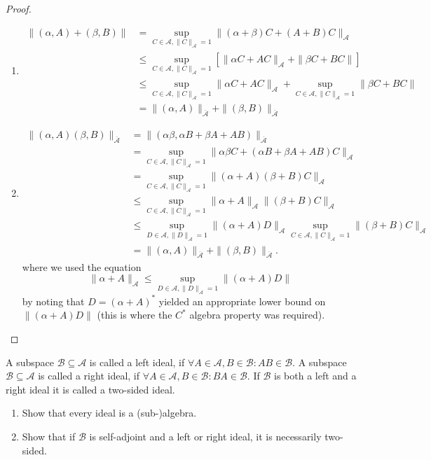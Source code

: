 \begin{proof}
	\begin{enumerate}
		\item 
			\begin{align*}
				\|(\alpha, A) + (\beta, B)\| &= \sup_{C\in \mathcal{A}, \|C\|_\mathcal{A}=1} \|(\alpha+\beta)C + (A+B)C\|_\mathcal{A} \\
							     &\le \sup_{C\in \mathcal{A}, \|C\|_\mathcal{A}=1}\left[ \|\alpha C + A C\|_\mathcal{A} + \|\beta C + BC\| \right]\\ 
							     &\le \sup_{C\in \mathcal{A}, \|C\|_\mathcal{A}=1} \|\alpha C + A C\|_\mathcal{A} + \sup_{C\in \mathcal{A}, \|C\|_\mathcal{A}=1} \|\beta C + B C\| \\
							     &= \|(\alpha, A)\|_{\overline{\mathcal{A}}} + \|(\beta, B)\|_{\overline{\mathcal{A}}}
			\end{align*}
		\item 
			\begin{align*}
				\|(\alpha, A)(\beta, B)\|_{\overline{\mathcal{A}}} &= \|(\alpha\beta, \alpha B + \beta A + AB)\|_{\overline{\mathcal{A}}} \\
			&= \sup_{C\in \mathcal{A}, \|C\|_\mathcal{A}=1} \|\alpha\beta C + (\alpha B+ \beta A + AB)C\|_\mathcal{A} \\
			&= \sup_{C\in \mathcal{A}, \|C\|_\mathcal{A}=1} \|(\alpha + A)(\beta + B)C\|_\mathcal{A} \\
			&\le \sup_{C\in \mathcal{A}, \|C\|_\mathcal{A}=1} \|\alpha + A\|_\mathcal{A} \|(\beta + B)C\|_\mathcal{A} \\
			&\le \sup_{D\in \mathcal{A}, \|D\|_\mathcal{A}=1}\|(\alpha + A)D\|_\mathcal{A} \sup_{C\in \mathcal{A}, \|C\|_\mathcal{A}=1} \|(\beta + B)C\|_\mathcal{A}\\
			&= \|(\alpha, A)\|_{\overline{\mathcal{A}}} + \|(\beta, B)\|_{\overline{\mathcal{A}}}.
			\end{align*}
where we used the equation
\[
	\|\alpha + A\|_\mathcal{A}\le \sup_{D\in \mathcal{A}, \|D\|_\mathcal{A}=1}\|(\alpha + A)D\|
\]
by noting that $D = (\alpha + A)^*$ yielded an appropriate lower bound on $\|(\alpha + A)D\|$ (this is where the $C^*$ algebra property was required).\qedhere
	\end{enumerate}
\end{proof}	
\begin{Problem}[Ideals]
	A subspace $\mathcal{B} \subseteq \mathcal{A}$ is called a left ideal, if $\forall A \in \mathcal{A}, B \in \mathcal{B}: AB \in \mathcal{B}$. A subspace $\mathcal{B} \subseteq \mathcal{A}$ is called a right ideal, if $\forall A \in \mathcal{A}, B \in \mathcal{B}: BA \in \mathcal{B}$. If $\mathcal{B}$ is both a left and a right ideal it is called a two-sided ideal.
	
	\begin{enumerate}
		\item Show that every ideal is a (sub-)algebra.
		\item Show that if $\mathcal{B}$ is self-adjoint and a left or right ideal, it is necessarily two-sided.
	\end{enumerate}
\end{Problem}
